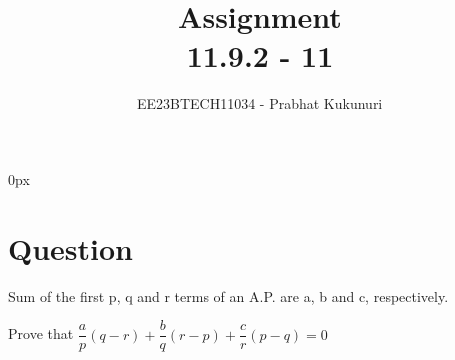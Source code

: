 \documentclass[journal,12pt,twocolumn]{IEEEtran}
\theoremstyle{remark}
\begin{document}
\parindent 0px


\vspace{3cm}

\title{Assignment\\[1ex]11.9.2 - 11}
\author{EE23BTECH11034 - Prabhat Kukunuri$^{}$%
}
\maketitle
\newpage
\bigskip

\renewcommand{\thefigure}{\theenumi}
\renewcommand{\thetable}{\theenumi}
\section*{Question}
Sum of the first p, q and r terms of an A.P. are a, b and c, respectively.

Prove that $\dfrac{a}{p}(q-r)+\dfrac{b}{q}(r-p)+\dfrac{c}{r}(p-q)=0$
\end{document}

